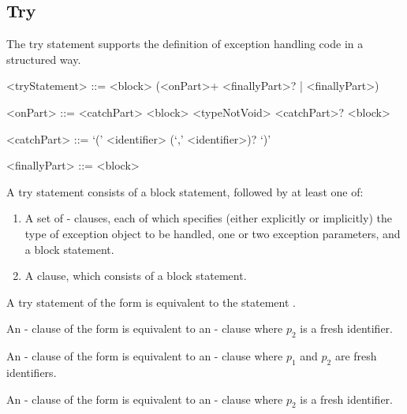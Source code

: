 \documentclass[makeidx]{article}
\begin{document}
{\subsection{Try}

\LMHash{}%
The try statement supports the definition of exception handling code
in a structured way.

\begin{grammar}
<tryStatement> ::= \TRY{} <block> (<onPart>+ <finallyPart>? | <finallyPart>)

<onPart> ::= <catchPart> <block>
  \alt \ON{} <typeNotVoid> <catchPart>? <block>

<catchPart> ::= \CATCH{} `(' <identifier> (`,' <identifier>)? `)'

<finallyPart> ::= \FINALLY{} <block>
\end{grammar}

\LMHash{}%
A try statement consists of a block statement, followed by at least one of:
\begin{enumerate}
\item
  A set of \ON{}-\CATCH{} clauses, each of which specifies
  (either explicitly or implicitly)
  the type of exception object to be handled,
  one or two exception parameters,
  and a block statement.
\item
A \FINALLY{} clause, which consists of a block statement.
\end{enumerate}


\LMHash{}%
A try statement of the form
is equivalent to the statement
.

\LMHash{}%
An \ON{}-\CATCH{} clause of the form
is equivalent to an \ON{}-\CATCH{} clause
where $p_2$ is a fresh identifier.

\LMHash{}%
An \ON{}-\CATCH{} clause of the form
is equivalent to an \ON{}-\CATCH{} clause
where $p_1$ and $p_2$ are fresh identifiers.

\LMHash{}%
An \ON{}-\CATCH{} clause of the form
is equivalent to an \ON{}-\CATCH{} clause
where $p_2$ is a fresh identifier.

}
\end{document}

